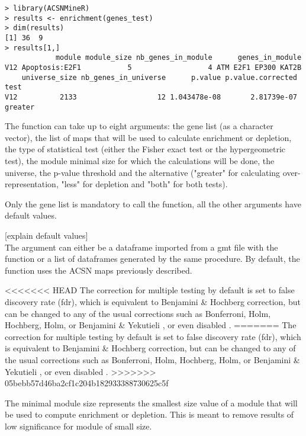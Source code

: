 \documentclass[article]{jss}
\begin{document}
\begin{verbatim}
> library(ACSNMineR)
> results <- enrichment(genes_test)
> dim(results)
[1] 36  9
> results[1,]
            module module_size nb_genes_in_module      genes_in_module
V12 Apoptosis:E2F1           5                  4 ATM E2F1 EP300 KAT2B
    universe_size nb_genes_in_universe      p.value p.value.corrected    test
V12          2133                   12 1.043478e-08       2.81739e-07 greater
\end{verbatim}



The  function can take up to eight arguments: the gene list (as
a character vector), the list of maps that will be used to calculate enrichment
or depletion, the type of statistical test (either the Fisher exact test or the
hypergeometric test), the module minimal size for which the calculations will be
done, the universe, the p-value threshold and the alternative ("greater" for
calculating over-representation, "less" for depletion and "both" for both
tests).

Only the gene list is mandatory to call the  function, all the
other arguments have default values.  

[explain default values]\\
The  argument can either be a dataframe imported from a gmt file with the  function or a list of dataframes generated by the same procedure. By default, the function uses the ACSN maps previously described.

<<<<<<< HEAD
The correction for multiple testing by default is set to false discovery rate
(fdr), which is equivalent to Benjamini \& Hochberg correction, but can be
changed to any of the usual corrections such as Bonferroni, Holm, Hochberg,
Holm, or Benjamini \& Yekutieli \citep{Benjamini2003FDR}, or even disabled .
=======
The correction for multiple testing by default is set to false discovery rate (fdr), which is equivalent to Benjamini \& Hochberg correction, but can be changed to any of the usual corrections such as Bonferroni, Holm, Hochberg, Holm, or Benjamini \& Yekutieli \citep{Benjamini2003FDR}, or even disabled .
>>>>>>> 05bebb57d46ba2cf1c204b182933388730625c5f

The minimal module size represents the smallest size value of a module that will be used to compute enrichment or depletion. This is meant to remove results of low significance for module of small size.
\end{document}
